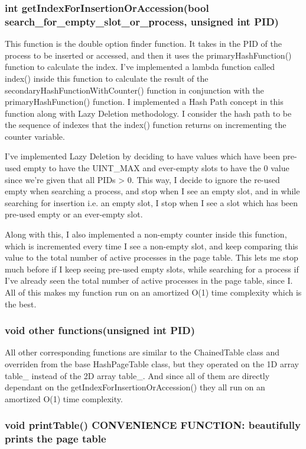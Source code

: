     \subsubsection{{\color{orange}int} {\color{draculapurple}getIndexForInsertionOrAccession}({\color{orange}bool} search\_for\_empty\_slot\_or\_process, {\color{orange}unsigned int} PID)}
        This function is the double option finder function. It takes in the {\color{orange}PID} of the process to be inserted or accessed, and then it uses the {\color{draculapurple}primaryHashFunction()} function to calculate the index.
        I've implemented a {\color{GoldenYellow}lambda function} called {\color{draculapurple}index()} inside this function to calculate the result of the {\color{draculapurple}secondaryHashFunctionWithCounter()} function in conjunction with the {\color{draculapurple} primaryHashFunction()} function.
        I implemented a {\color{GoldenYellow} Hash Path concept} in this function along with {\color{GoldenYellow}Lazy Deletion} 
        methodology. I consider the hash path to be the sequence of indexes that the {\color{draculapurple}index()} function returns on incrementing the {\color{orange}counter} variable.

        I've implemented Lazy Deletion by deciding to have values which have been pre-used empty to have the 
        {\color{LimeGreen}UINT\_MAX} and ever-empty slots to have the {\color{LimeGreen}0} value since we're 
        given that all PIDs > 0. This way, I decide to ignore the re-used empty when searching a process, and 
        stop when I see an empty slot, and in while searching for insertion i.e. an empty slot, I stop when 
        I see a slot which has been pre-used empty or an ever-empty slot.

        Along with this, I also implemented a non-empty counter inside this function, which is incremented every 
        time I see a non-empty slot, and keep comparing this value to the total number of active processes in the 
        page table. This lets me stop much before if I keep seeing pre-used empty slots, while searching for a 
        process if I've already seen the total number of active processes in the page table, since I.
        All of this makes my function run on an amortized {\color{lightblue}O(1)} time complexity which is the best.

    \subsubsection{{\color{orange}void} {\color{draculapurple}other functions}({\color{orange}unsigned int} PID)}
        All other corresponding functions are similar to the {\color{draculapurple}ChainedTable} class and overriden from the base {\color{draculapurple}HashPageTable} class, but they 
        operated on the 1D array {\color{Turquoise}table\_} instead of the 2D array {\color{Turquoise}table\_}.
        And since all of them are directly dependant on the {\color{draculapurple}getIndexForInsertionOrAccession()} 
        they all run on an amortized {\color{lightblue}O(1)} time complexity.

    \subsubsection{{\color{orange}void} {\color{draculapurple}printTable}() {\color{Awesome}CONVENIENCE FUNCTION:} {\color{yellow}beautifully prints the page table}} 
